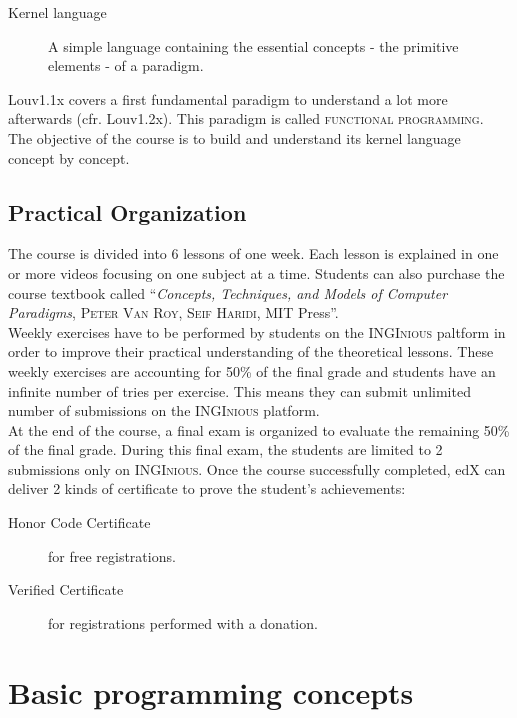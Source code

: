 \documentclass[11pt,a4paper,twoside,openright]{report}
\begin{document}
\begin{description}
 \item[Kernel language] A simple language containing the essential concepts - 
the primitive elements - of a paradigm.
\end{description}

Louv1.1x covers a first fundamental paradigm to understand a lot more 
afterwards (cfr. Louv1.2x). This paradigm is called \textsc{functional 
programming}. The objective of the course is to build and understand its kernel 
language concept by concept.

\subsection{Practical Organization}
The course is divided into 6 lessons of one week. Each lesson is explained in one 
or more videos focusing on one subject at a time. Students can also purchase 
the course textbook called \enquote{\textit{Concepts, Techniques, and Models of 
Computer Paradigms}, \textsc{Peter Van Roy}, \textsc{Seif Haridi}, MIT Press}.\\

Weekly exercises have to be performed by students on the \textsc{INGInious} 
paltform in order to improve their practical understanding of the theoretical 
lessons. These weekly exercises are accounting for 50\% of the final grade and 
students have an infinite number of tries per exercise. This means they can 
submit unlimited number of submissions on the \textsc{INGInious} platform.\\

At the end of the course, a final exam is organized to evaluate the remaining 
50\% of the final grade. During this final exam, the students are limited to 2 
submissions only on \textsc{INGInious}.
Once the course successfully completed, edX can deliver 2 kinds of certificate 
to prove the student's achievements:

\begin{description}
  \item [Honor Code Certificate] for free registrations.
  \item [Verified Certificate] for registrations performed with a donation.
\end{description}

\section{Basic programming concepts}
\end{document}
